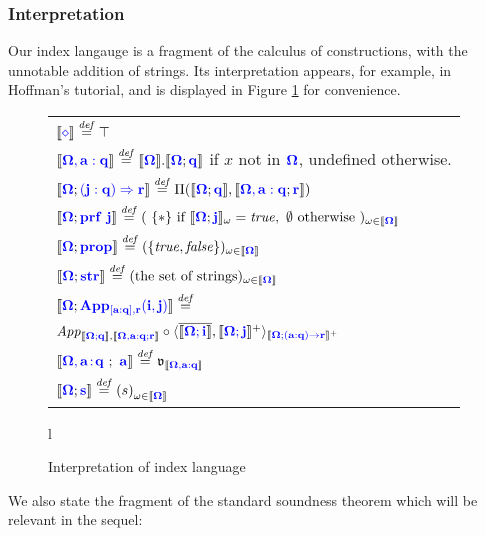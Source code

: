 \documentclass[sigplan,10pt,review,anonymous]{acmart}
\newcommand{\blum}[1]{\mathbf{\color{blue}{#1}}}
\newcommand{\defeq}{\overset{\mathit{def}}{=}}
\newcommand{\sem}[1]{\llbracket #1 \rrbracket}
\newcommand{\fm}[2]{
\left(
\tiny
#1
\normalsize
\right)_{#2}
}
\begin{document}
\subsubsection{Interpretation}

Our index langauge is a fragment of the calculus of constructions, with the unnotable addition of strings. Its interpretation appears, for example, in Hoffman's tutorial\cite{Hofmann97syntaxand}, and is displayed in Figure \ref{fig:index-interp} for convenience. 

\begin{figure}
\begin{small}
\begin{tabular}{l}
$\sem{\blum{\diamond}} \defeq \top$ \\
$\sem{\blum{\Omega,a:q}} \defeq \sem{\blum{\Omega}}.\sem{\blum{\Omega};\blum{q}}$ if $x$ not in $\blum{\Omega}$, undefined otherwise.\\
$\sem{\blum{\Omega}; \blum{(j : q) \Rightarrow r}} \defeq \Pi(\sem{\blum{\Omega};\blum{q}},\sem{\blum{\Omega,a:q};\blum{r}})$ \\
$\sem{\blum{\Omega}; \blum{\mathbf{prf}~j}} \defeq (~\{ \ast \} \text{ if } \sem{\blum{\Omega}; \blum{j}}_\omega = \mathit{true}, \text{~}\emptyset\text{ otherwise}~)_{\omega \in \sem{\blum{\Omega}}}$ \\
$\sem{\blum{\Omega}; \blum{prop}} \defeq ( \{ \mathit{true}, \mathit{false} \} )_{\omega \in \sem{\blum{\Omega}}}$\\
$\sem{\blum{\Omega}; \blum{str}} \defeq (\text{the set of strings})_{\omega \in \sem{\blum{\Omega}}}$\\
$\sem{\blum{\Omega}; \blum{App_{[a:q],r}(i,j)}} \defeq$ \\
\hspace{1.5ex} $\mathit{App}_{\sem{\blum{\Omega;q}},\sem{\blum{\Omega,a:q;r}}} \circ \langle \overline{\sem{\blum{\Omega ; i}}}, \sem{\blum{\Omega ; j}}^+ \rangle_{\sem{\blum{\Omega ; \blum{(a : q) \to r}}}^+}$ \\
$\sem{\blum{\Omega,a \! : \! q}~;~\blum{a}} \defeq \frak{v}_{\sem{\blum{\Omega,a:q}}}$ \\
$\sem{\blum{\Omega};\blum{s}} \defeq \fm{s}{\omega \in \sem{\blum{\Omega}}}$
\end{tabular}{l}
\end{small}
\caption{Interpretation of index language}
\label{fig:index-interp}
\end{figure}

We also state the fragment of the standard soundness theorem which will be relevant in the sequel: 
\end{document}

